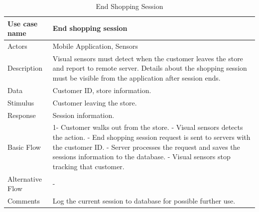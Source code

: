 \documentclass[11pt]{article}
\begin{document}
        \begin{table}[H]
        \begin{centering}        
        \begin{tabular}{|p{2.5cm}|p{12cm}|}
        \hline
        Use case name & End shopping session  \\ \hline
        Actors        & Mobile Application, Sensors \\ \hline
        Description   & Visual sensors must detect when the customer leaves the store and report to remote server. Details about the shopping session must be visible from the application after session ends.  \\ \hline
        Data          & Customer ID, store information.  \\ \hline
        Stimulus      & Customer leaving the store. \\ \hline
        Response      & Session information. \\ \hline
        Basic Flow    & 
        1- Customer walks out from the store. \newline
        2- Visual sensors detects the action. \newline
        3- End shopping session request is sent to servers with the customer ID. \newline
        4- Server processes the request and saves the sessions information to the database. \newline
        5- Visual sensors stop tracking that customer. \\ \hline
        Alternative
            Flow      & - \\ \hline
        Comments      & Log the current session to database for possible further use.  \\ \hline
        
        \end{tabular}
        \caption{End Shopping Session}
        \label{tab6}
        \end{centering}
        \end{table}    
        
        
                
\end{document}
